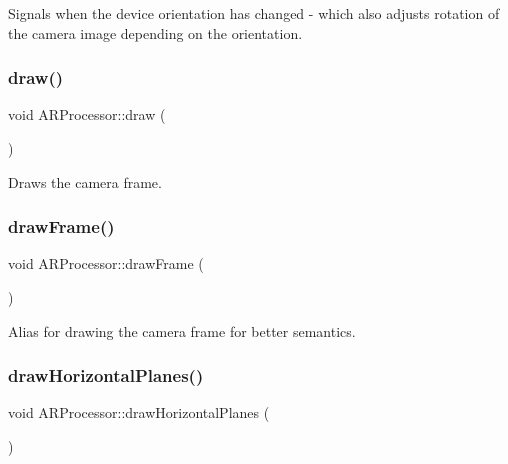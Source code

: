 Signals when the device orientation has changed -\/ which also adjusts rotation of the camera image depending on the orientation. \mbox{\label{class_a_r_processor_a20418bd305702c3346a109da9e1afcb0}} 
\subsubsection{\texorpdfstring{draw()}{draw()}}
{\footnotesize\ttfamily void A\+R\+Processor\+::draw (\begin{DoxyParamCaption}{ }\end{DoxyParamCaption})}



Draws the camera frame. 

\mbox{\label{class_a_r_processor_a685469fa6b66b8b5d935f6f45a2ef599}} 
\subsubsection{\texorpdfstring{draw\+Frame()}{drawFrame()}}
{\footnotesize\ttfamily void A\+R\+Processor\+::draw\+Frame (\begin{DoxyParamCaption}{ }\end{DoxyParamCaption})}



Alias for drawing the camera frame for better semantics. 

\mbox{\label{class_a_r_processor_a6a61a7e03821410bc1a715fd32159662}} 
\subsubsection{\texorpdfstring{draw\+Horizontal\+Planes()}{drawHorizontalPlanes()}}
{\footnotesize\ttfamily void A\+R\+Processor\+::draw\+Horizontal\+Planes (\begin{DoxyParamCaption}{ }\end{DoxyParamCaption})}



